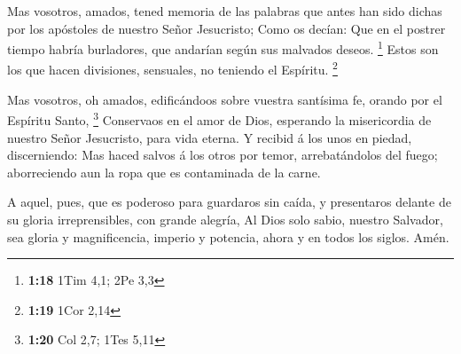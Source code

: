  Mas vosotros, amados, tened memoria de las palabras que
antes han sido dichas por los apóstoles de nuestro Señor Jesucristo;
 Como os decían: Que en el postrer tiempo habría
burladores, que andarían según sus malvados deseos. \footnote{\textbf{1:18}
  1Tim 4,1; 2Pe 3,3}  Estos son los que hacen divisiones,
sensuales, no teniendo el Espíritu. \footnote{\textbf{1:19} 1Cor 2,14}

 Mas vosotros, oh amados, edificándoos sobre vuestra
santísima fe, orando por el Espíritu Santo, \footnote{\textbf{1:20} Col
  2,7; 1Tes 5,11}  Conservaos en el amor de Dios,
esperando la misericordia de nuestro Señor Jesucristo, para vida eterna.
 Y recibid á los unos en piedad, discerniendo:
 Mas haced salvos á los otros por temor, arrebatándolos
del fuego; aborreciendo aun la ropa que es contaminada de la carne.

 A aquel, pues, que es poderoso para guardaros sin caída,
y presentaros delante de su gloria irreprensibles, con grande alegría,
 Al Dios solo sabio, nuestro Salvador, sea gloria y
magnificencia, imperio y potencia, ahora y en todos los siglos. Amén.
